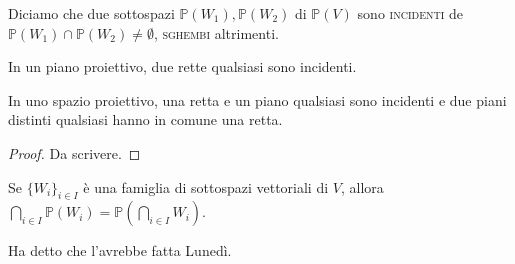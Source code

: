 \begin{defn}
  Diciamo che due sottospazi $\mathbb{P}(W_1), \mathbb{P}(W_2)$ di $\mathbb{P}(V)$ sono \textsc{incidenti} de $\mathbb{P}(W_1) \cap \mathbb{P}(W_2) \not=\emptyset$, \textsc{sghembi} altrimenti.
\end{defn}

\begin{prop}
  \begin{nlist}
    \item In un piano proiettivo, due rette qualsiasi sono incidenti.
    \item In uno spazio proiettivo, una retta e un piano qualsiasi sono incidenti e due piani distinti qualsiasi hanno in comune una retta.
  \end{nlist}
\end{prop}

\begin{proof}
  Da scrivere.
\end{proof}

\begin{oss}
  \begin{nlist}
    \item Se $\{W_i\}_{i \in I}$ è una famiglia di sottospazi vettoriali di $V$, allora $\displaystyle \bigcap_{i \in I} \mathbb{P}(W_i)=\mathbb{P}\left(\bigcap_{i \in I}W_i\right)$.
    \item Ha detto che l'avrebbe fatta Lunedì.
  \end{nlist}
\end{oss}
